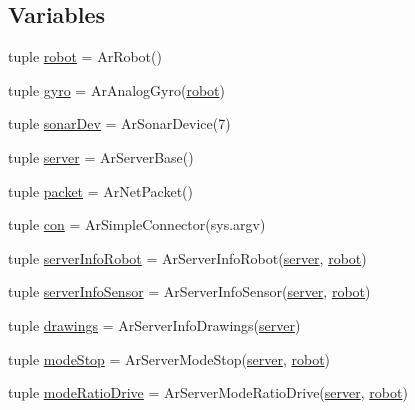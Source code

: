 \subsection*{Variables}
\begin{DoxyCompactItemize}
\item 
tuple \hyperlink{namespaceservidor__novo_ae604d92f7f5c43d2a993ae9402534424}{robot} = ArRobot()
\item 
tuple \hyperlink{namespaceservidor__novo_a2b0e3a19479a3a456184ce1f64a648a0}{gyro} = ArAnalogGyro(\hyperlink{namespaceservidor__novo_ae604d92f7f5c43d2a993ae9402534424}{robot})
\item 
tuple \hyperlink{namespaceservidor__novo_a966ece9821b12a79fc5b83f628987f7d}{sonarDev} = ArSonarDevice(7)
\item 
tuple \hyperlink{namespaceservidor__novo_a538b68fbb948f9cf0573a119042c9e0d}{server} = ArServerBase()
\item 
tuple \hyperlink{namespaceservidor__novo_a4644b693a5931c2f1a9d68500534d955}{packet} = ArNetPacket()
\item 
tuple \hyperlink{namespaceservidor__novo_a201a5b59bc2f5a75d2a4c82d81f17180}{con} = ArSimpleConnector(sys.argv)
\item 
tuple \hyperlink{namespaceservidor__novo_aae2aad1feed83599e4783f4d39086ee6}{serverInfoRobot} = ArServerInfoRobot(\hyperlink{namespaceservidor__novo_a538b68fbb948f9cf0573a119042c9e0d}{server}, \hyperlink{namespaceservidor__novo_ae604d92f7f5c43d2a993ae9402534424}{robot})
\item 
tuple \hyperlink{namespaceservidor__novo_a31795a5817e65297017799e1fdbc6fdd}{serverInfoSensor} = ArServerInfoSensor(\hyperlink{namespaceservidor__novo_a538b68fbb948f9cf0573a119042c9e0d}{server}, \hyperlink{namespaceservidor__novo_ae604d92f7f5c43d2a993ae9402534424}{robot})
\item 
tuple \hyperlink{namespaceservidor__novo_aaddb28ac7dd14daa90eaadd8fde37bbd}{drawings} = ArServerInfoDrawings(\hyperlink{namespaceservidor__novo_a538b68fbb948f9cf0573a119042c9e0d}{server})
\item 
tuple \hyperlink{namespaceservidor__novo_a63f8dd02ccddbc7be4de022c23246578}{modeStop} = ArServerModeStop(\hyperlink{namespaceservidor__novo_a538b68fbb948f9cf0573a119042c9e0d}{server}, \hyperlink{namespaceservidor__novo_ae604d92f7f5c43d2a993ae9402534424}{robot})
\item 
tuple \hyperlink{namespaceservidor__novo_a17ac782014a1ecc8ae25509094a6812b}{modeRatioDrive} = ArServerModeRatioDrive(\hyperlink{namespaceservidor__novo_a538b68fbb948f9cf0573a119042c9e0d}{server}, \hyperlink{namespaceservidor__novo_ae604d92f7f5c43d2a993ae9402534424}{robot})

\end{DoxyCompactItemize}
